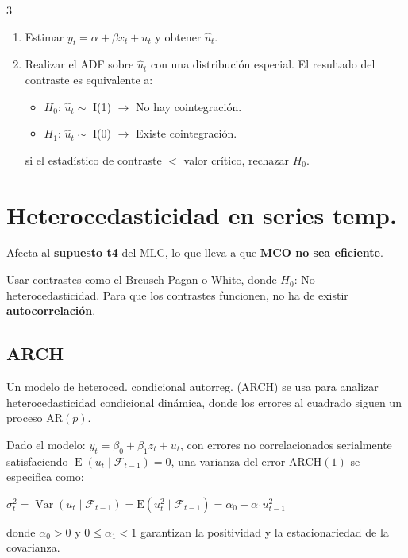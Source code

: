 \documentclass[10pt, a4paper, landscape]{article}
\DeclareMathOperator{\E}{E}
\DeclareMathOperator{\Var}{Var}
\begin{document}
\begin{multicols}{3}
\begin{enumerate}[leftmargin=*]
	\item Estimar \( y_{t} = \alpha + \beta x_{t} + u_{t} \) y obtener \( \hat{u}_{t} \).
	\item Realizar el ADF sobre \( \hat{u}_{t} \) con una distribución especial.
	El resultado del contraste es equivalente a:
	\begin{itemize}[leftmargin=*]
		\item \( H_{0} \):  \( \hat{u}_{t} \sim \) I(1) \( \rightarrow \) No hay cointegración.
		\item \( H_{1} \): \( \hat{u}_{t} \sim \) I(0) \( \rightarrow \) Existe cointegración.
	\end{itemize}
	si el estadístico de contraste \( < \) valor crítico, rechazar \( H_{0} \).
\end{enumerate}

\section*{Heterocedasticidad en series temp.}

Afecta al \textbf{supuesto t4} del MLC, lo que lleva a que \textbf{MCO no sea eficiente}.

Usar contrastes como el Breusch-Pagan o White, donde \( H_{0} \): No heterocedasticidad. Para que los contrastes funcionen, no ha de existir \textbf{autocorrelación}.

\subsection*{ARCH}

Un modelo de heteroced. condicional autorreg. (ARCH) se usa para analizar heterocedasticidad condicional dinámica, donde los errores al cuadrado siguen un proceso \( \text{AR}(p) \).

Dado el modelo: \( y_{t} = \beta_{0} + \beta_{1} z_{t} + u_{t} \), con errores no correlacionados serialmente satisfaciendo \( \E(u_{t} \mid \mathcal{F}_{t - 1}) = 0 \), una varianza del error \( \text{ARCH}(1) \) se especifica como:

\begin{center}
	\( \sigma_{t}^{2} = \Var(u_{t} \mid \mathcal{F}_{t - 1}) = \text{E}(u_{t}^{2} \mid \mathcal{F}_{t - 1}) = \alpha_{0} + \alpha_{1} u_{t - 1}^{2} \)
\end{center}

donde \( \alpha_{0} > 0 \) y \( 0 \leq \alpha_{1} < 1 \) garantizan la positividad y la estacionariedad de la covarianza.

\end{multicols}
\end{document}
